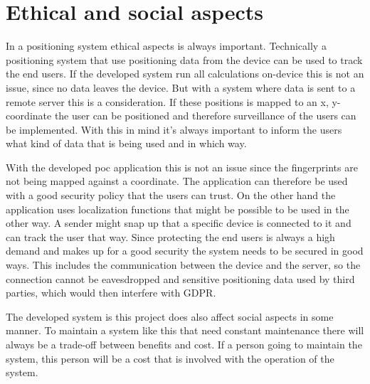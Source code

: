 





\section{Ethical and social aspects}\label{sec:discussionAspects}
In a positioning system ethical aspects is always important.
Technically a positioning system that use positioning data from the device can be used to track the end users.
If the developed system run all calculations on-device this is not an issue, since no data leaves the device.
But with a system where data is sent to a remote server this is a consideration.
If these positions is mapped to an x, y-coordinate the user can be positioned and therefore surveillance of the users can be implemented.
With this in mind it's always important to inform the users what kind of data that is being used and in which way.

\bigskip

With the developed \acrshort{poc} application this is not an issue since the fingerprints are not being mapped against a coordinate.
The application can therefore be used with a good security policy that the users can trust.
On the other hand the application uses localization functions that might be possible to be used in the other way.
A sender might snap up that a specific device is connected to it and can track the user that way.
Since protecting the end users is always a high demand and makes up for a good security the system needs to be secured in good ways.
This includes the communication between the device and the server, so the connection cannot be eavesdropped and sensitive positioning data used by third parties, which would then interfere with GDPR.

\bigskip

The developed system is this project does also affect social aspects in some manner.
To maintain a system like this that need constant maintenance there will always be a trade-off between benefits and cost.
If a person going to maintain the system, this person will be a cost that is involved with the operation of the system.

